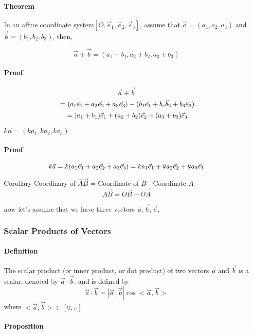 \documentclass[UTF8]{ctexart}
\begin{document}
\paragraph{ Theorem}  In an affine coordinate system$[O,\vec e_1,\vec e_2,\vec e_3]$, 
assume that $\vec a = (a_1, a_2, a_3)$ and $\vec b = (b_1, b_2, b_3)$, then,

$$\vec a +\vec b = (a_1+b_1,a_2+b_2,a_3+b_3)$$

\paragraph{ Proof}
$$
\vec a + \vec b  
$$
$$
\\ = (a_1\vec e_1 + a_2 \vec e_2 + a_3\vec e_3 )+ (b_1\vec e_1 + b_e \vec b_2 + b_3\vec e_3 ) 
$$
$$
\\ = (a_1+b_1)\vec e_1 + (a_2+b_2) \vec e_2 + (a_3+b_3) \vec e_3
$$

$k \vec a  = (ka_1,ka_2,ka_3)$

\paragraph{Proof}
$$
k \vec a 
\\ = k(a_1\vec e_1 + a_2 \vec e_2 + a_3\vec e_3)
\\ = k a_1\vec e_1 + k a_2 \vec e_2 + k a_3\vec e_3
$$


Corollary Coordinary of $\overrightarrow {AB}$ = Coordinate of $B$  - Coordinate $A$
$$
\overrightarrow{AB} = \overrightarrow{OB} - \overrightarrow {OA}
$$

now let's assume that we have three vectors $\vec a ,\vec b , \vec c$,


\subsubsection{Scalar Products of Vectors}


\paragraph{ Definition}
The scalar product (or inner product, or dot product) of two vectors $\vec a$ and $\vec b$ is a scalar, denoted by $\vec a \cdot \vec b$, and is defined by 
$$
\vec a \cdot \vec b  = |\vec a||\vec b|\cos<\vec a,\vec b >
$$
where $ <\vec a,\vec b>\in [0,\pi] $

\paragraph{ Proposition}
\end{document}
